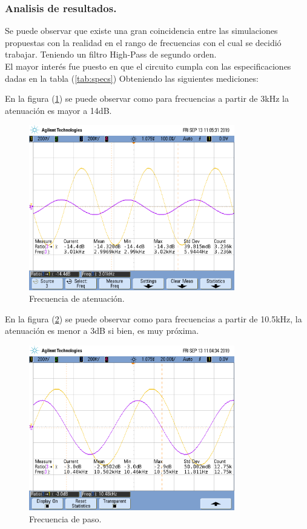 \subsubsection{Analisis de resultados.} 
Se puede observar que existe una gran coincidencia entre las simulaciones propuestas con la realidad en el rango de frecuencias con el cual se decidió trabajar. Teniendo un filtro High-Pass de segundo orden.\\
El mayor interés fue puesto en que el circuito cumpla con las especificaciones dadas en la tabla (\ref{tab:specs})
Obteniendo las siguientes mediciones:


En la figura (\ref{fig:fahp}) se puede observar como para frecuencias a partir de 3kHz la atenuación es mayor a 14dB.
\begin{figure}[H]	
	\centering
	\includegraphics[width=0.8\textwidth, trim = {0 3.35cm 0 2cm},clip]{ImagenesEj2/MedicionesGrilla/fa_hp.png}
	\caption{Frecuencia de atenuación.}
	\label{fig:fahp}
\end{figure}

En la figura (\ref{fig:fphp}) se puede observar como para frecuencias a partir de 10.5kHz, la atenuación es menor a 3dB si bien, es muy próxima.

\begin{figure}[H]	
	\centering
	\includegraphics[width=0.8\textwidth, trim = {0 3.35cm 0 2cm},clip]{ImagenesEj2/MedicionesGrilla/fp_hp.png}
	\caption{Frecuencia de paso.}
	\label{fig:fphp}
\end{figure}

